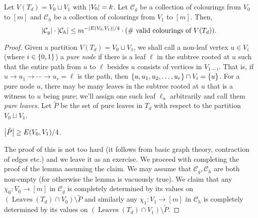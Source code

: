 \begin{lemma}\label{lem:MonSep-partial-colourings-consistence}
  Let $V(T_d) = V_0 \sqcup V_1$ with $\left|V_0\right| = k$. Let $\mathcal{C}_g$ be a collection of colourings from $V_0$ to $[m]$ and $\mathcal{C}_h$ be a collection of colourings from $V_1$ to $[m]$. Then,
  \[
    \left|\mathcal{C}_g\right| \cdot \left|\mathcal{C}_h\right| \leq m^{-\left|E(V_0,V_1)\right|/4} \cdot (\#\text{ valid colourings of $V(T_d)$}).
  \]
\end{lemma}
\begin{proof}
  Given a partition $V(T_d) = V_0 \sqcup V_1$, we shall call a non-leaf vertex $u \in V_i$ (where $i \in \left\{0,1\right\}$) a \emph{pure node} if there is a leaf $\ell$ in the subtree rooted at $u$ such that the entire path from $u$ to $\ell$ besides $u$ consists of vertices in $V_{1-i}$.
That is, if $u\rightarrow u_1 \rightarrow \cdots \rightarrow u_r = \ell$ is the path, then $\left\{u,u_1,u_2,\ldots, u_r\right\} \cap V_i = \left\{u\right\}$.
For a pure node $u$, there may be many leaves in the subtree rooted at $u$ that is a witness to $u$ being pure; we'll assign one such leaf $\ell_u$ arbitrarily and call them \emph{pure leaves}.
Let $\tilde{P}$ be the set of pure leaves in $T_d$ with respect to the partition $V_0\sqcup V_1$.
\begin{addmargin}[2em]{2em}
  \begin{subclaim}\label{subclaim:monSep-many-pure-nodes}
    $\left|\tilde{P}\right| \geq E(V_0,V_1)/4$.
  \end{subclaim}

  \bigskip

\end{addmargin}

The proof of this is not too hard (it follows from basic graph theory, contraction of edges etc.) and we leave it as an exercise. We proceed with completing the proof of the lemma assuming the claim. We may assume that $\mathcal{C}_g,\mathcal{C}_h$ are both non-empty (for otherwise the lemma is vacuously true). We claim that any $\chi_0:V_0 \rightarrow [m]$ in $\mathcal{C}_g$ is completely determined by its values on $(\operatorname{Leaves}(T_d) \cap V_0) \setminus \tilde{P}$ and similarly any $\chi_1:V_1\rightarrow [m]$ in $\mathcal{C}_h$ is completely determined by its values on $(\operatorname{Leaves}(T_d) \cap V_1) \setminus \tilde{P}$.


\end{proof}
